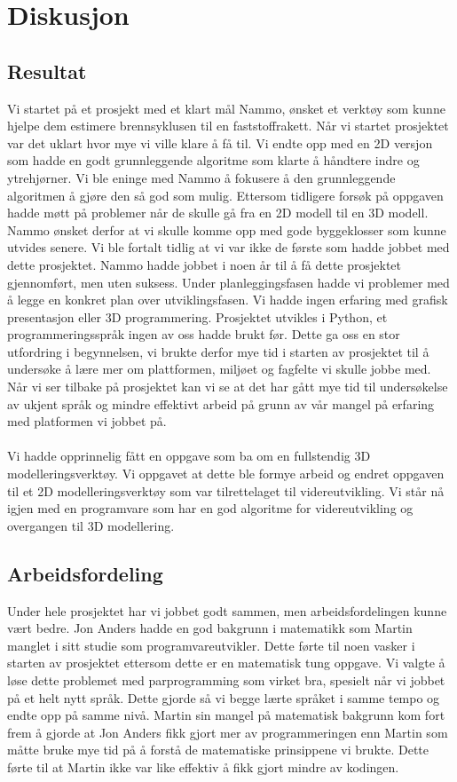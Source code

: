 \chapter{Diskusjon}
\label{chap:discussion}

\section{Resultat}
Vi startet på et prosjekt med et klart mål Nammo, ønsket et verktøy som kunne hjelpe dem estimere brennsyklusen til en faststoffrakett.  Når vi startet prosjektet var det uklart hvor mye vi ville klare å få til. Vi endte opp med en 2D versjon som hadde en godt grunnleggende algoritme som klarte å håndtere indre og ytrehjørner. Vi ble eninge med Nammo å fokusere å den grunnleggende algoritmen å gjøre den så god som mulig. Ettersom tidligere forsøk på oppgaven hadde møtt på problemer når de skulle gå fra en 2D modell til en 3D modell. Nammo ønsket derfor at vi skulle komme opp med gode byggeklosser som kunne utvides senere. Vi ble fortalt tidlig at vi var ikke de første som hadde jobbet med dette prosjektet. Nammo hadde jobbet i noen år til å få dette prosjektet gjennomført, men uten suksess. Under planleggingsfasen hadde vi problemer med å legge en konkret plan over utviklingsfasen. Vi hadde ingen erfaring med grafisk presentasjon eller 3D programmering. Prosjektet utvikles i Python, et programmeringsspråk ingen av oss hadde brukt før. Dette ga oss en stor utfordring i begynnelsen, vi brukte derfor mye tid i starten av prosjektet til å undersøke å lære mer om plattformen, miljøet og fagfelte vi skulle jobbe med. Når vi ser tilbake på prosjektet kan vi se at det har gått mye tid til undersøkelse av ukjent språk og mindre effektivt arbeid på grunn av vår mangel på erfaring med platformen vi jobbet på.\\ \\
\noindent
Vi hadde opprinnelig fått en oppgave som ba om en fullstendig 3D modelleringsverktøy. Vi oppgavet at dette ble formye arbeid og endret oppgaven til et 2D modelleringsverktøy som var tilrettelaget til videreutvikling. Vi står nå igjen med en programvare som har en god algoritme for videreutvikling og overgangen til 3D modellering.
	
\section{Arbeidsfordeling}
Under hele prosjektet har vi jobbet godt sammen, men arbeidsfordelingen kunne vært bedre. Jon Anders hadde en god bakgrunn i matematikk som Martin manglet i sitt studie som programvareutvikler. Dette førte til noen vasker i starten av prosjektet ettersom dette er en matematisk tung oppgave. Vi valgte å løse dette problemet med parprogramming som virket bra, spesielt når vi jobbet på et helt nytt språk. Dette gjorde så vi begge lærte språket i samme tempo og endte opp på samme nivå. Martin sin mangel på matematisk bakgrunn kom fort frem å gjorde at Jon Anders fikk gjort mer av programmeringen enn Martin som måtte bruke mye tid på å forstå de matematiske prinsippene vi brukte. Dette førte til at Martin ikke var like effektiv å fikk gjort mindre av kodingen.

